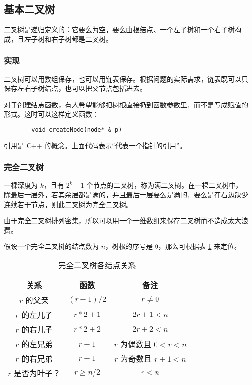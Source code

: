 \subsection{基本二叉树}
	二叉树是递归定义的：它要么为空，要么由根结点、一个左子树和一个右子树构成，且左子树和右子树都是二叉树。

    \subsubsection{实现}
	    二叉树可以用数组保存，也可以用链表保存。根据问题的实际需求，链表既可以只保存左右子树结点，也可以把父节点包括进去。
	    
	    
	    
	    对于创建结点函数，有人希望能够把树根直接扔到函数参数里，而不是写成赋值的形式。这时可以这样定义函数：
	    
	    \begin{lstlisting}
	    void createNode(node* & p)
	    \end{lstlisting}
	    
	    引用是 C++ 的概念。上面代码表示“代表一个指针的引用”。
    
    \subsubsection{完全二叉树}
	    一棵深度为 $k$，且有 $2^k-1$ 个节点的二叉树，称为满二叉树。在一棵二叉树中，除最后一层外，若其余层都是满的，并且最后一层要么是满的，要么是在右边缺少连续若干节点，则此二叉树为完全二叉树。
    
		由于完全二叉树排列密集，所以可以用一个一维数组来保存二叉树而不造成太大浪费。
		
		假设一个完全二叉树的结点数为 $n$，树根的序号是 0，那么可根据表 \ref{tab:ch3_jbecs_wqecs} 来定位。
		
		\begin{table}[htb]
			\centering
			\begin{tabular}{ccc}
				\toprule
				关系 &	函数 &	备注	\\
				\midrule
				$r$ 的父亲 &	$(r-1)/2$ &	$r\neq 0$	\\
				$r$ 的左儿子 &	$r*2+1$ &	$2r+1<n$	\\
				$r$ 的右儿子 &	$r*2+2$ &	$2r+2<n$	\\
				$r$ 的左兄弟 &	$r-1$ & $r$ 为偶数且 $0<r<n$	\\
				$r$ 的右兄弟 &	$r+1$ & $r$ 为奇数且 $r+1<n$	\\
				$r$ 是否为叶子？ &	$r\geqslant n/2$ &	$r<n$	\\
				\bottomrule
			\end{tabular}
			\label{tab:ch3_jbecs_wqecs}
			\caption{完全二叉树各结点关系}
		\end{table}
		
		
		